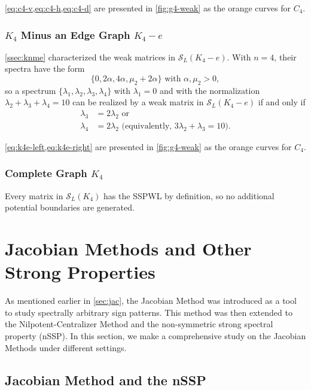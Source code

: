 \documentclass{article}
\theoremstyle{definition}
\newcommand{\mptn}{\mathcal{S}}
\begin{document}
\cref{eq:c4-v,eq:c4-h,eq:c4-d} are presented in \cref{fig:g4-weak} as the orange curves for $C_4$.

\subsubsection{\texorpdfstring{$K_4$}{K4} Minus an Edge Graph \texorpdfstring{$K_4 - e$}{K4 - e}}

\cref{ssec:knme} characterized the weak matrices in $\mptn_L(K_4 - e)$.  With $n = 4$, their spectra have the form 
\[
    \{0, 2\alpha, 4\alpha, \mu_2 + 2\alpha\} \text{ with }\alpha, \mu_2 > 0,
\]
so a spectrum $\{\lambda_1, \lambda_2, \lambda_3, \lambda_4\}$ with $\lambda_1 = 0$ and with the normalization $\lambda_2 + \lambda_3 + \lambda_4 = 10$ can be realized by a weak matrix in $\mptn_L(K_4 - e)$ if and only if 
\begin{align}
    \lambda_3 &= 2\lambda_2 \text{ or} \label{eq:k4e-left} \\ 
    \lambda_4 &= 2\lambda_2 \text{ (equivalently, }3\lambda_2 + \lambda_3 = 10\text{)}. \label{eq:k4e-right}
\end{align}

\cref{eq:k4e-left,eq:k4e-right} are presented in \cref{fig:g4-weak} as the orange curves for $C_4$.

\subsubsection{Complete Graph \texorpdfstring{$K_4$}{K4}}

Every matrix in $\mptn_L(K_4)$ has the SSPWL by definition, so no additional potential boundaries are generated.  

\section{Jacobian Methods and Other Strong Properties}
\label{sec:jacall}

As mentioned earlier in \cref{sec:jac}, the Jacobian Method was introduced as a tool to study spectrally arbitrary sign patterns.  This method was then extended to the Nilpotent-Centralizer Method and the non-symmetric strong spectral property (nSSP).  In this section, we make a comprehensive study on the Jacobian Methods under different settings.

\subsection{Jacobian Method and the nSSP}
\end{document}
